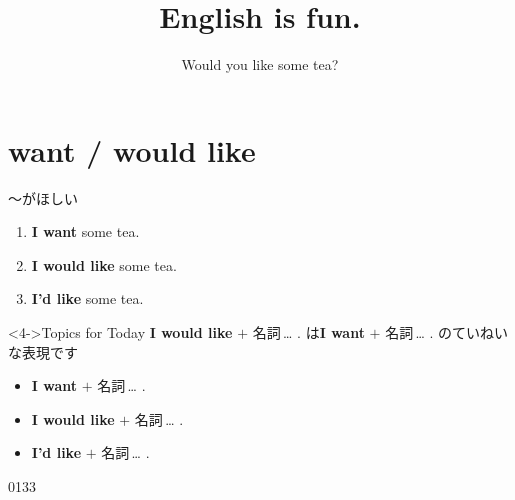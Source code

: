 \documentclass[aspectratio=169,xcolor={dvipsnames,table}]{beamer}
\title{English is fun.}
\subtitle{Would you like some tea?}
\author{}
\institute[]{}
\date[]
\begin{document}
\begin{frame}[plain]
  \titlepage
\end{frame}

\begin{frame}[plain]
 \hyperlink{today}{}
\end{frame}
\section{want / would like}
\begin{frame}[plain]{～がほしい}
\large
 \begin{enumerate}
  \item<1-> \textbf{I want} some tea.\hfill{\scriptsize {}}
  \item<2-> \textbf{I would like} some tea.\hfill{\scriptsize {}}
  \item<3-> {\bfseries I'd like} some tea.
 \end{enumerate}

\begin{block}<4->{Topics for Today}\small
\textbf{I would like} $+$ 名詞\,\ldots\,\,.\,\,は\textbf{I want} $+$ 名詞\,\ldots\,\,.\,\,のていねいな表現です
\begin{itemize}[square]\small
 \item \textbf{I want} $+$ 名詞\,\ldots\,\,.
 \item \textbf{I would like} $+$ 名詞\,\ldots\,\,.
 \item \textbf{I'd like} $+$ 名詞\,\ldots\,\,.
       \end{itemize}
\end{block}

\hfill{\tiny 0133}\,{\scriptsize {}}
\end{frame}
\end{document}
